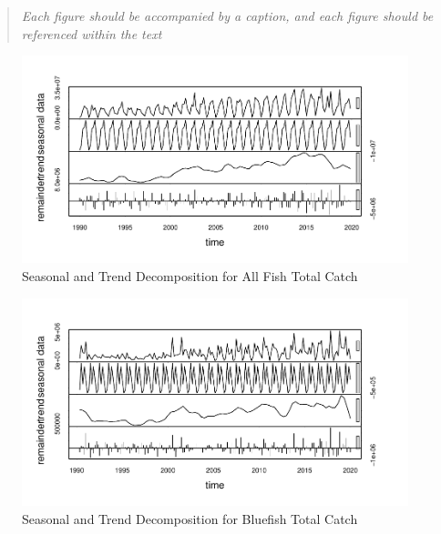 \documentclass[
  12pt,
]{article}
\begin{document}
\begin{quote}
\emph{Each figure should be accompanied by a caption, and each figure
should be referenced within the text}
\end{quote}

\begin{figure}[H]

\hfill{}\includegraphics{Report_FishTrends_files/figure-latex/All Fish Trends-1} 

\caption{Seasonal and Trend Decomposition for All Fish Total Catch}\label{fig:All Fish Trends}
\end{figure}

\begin{figure}[H]

\hfill{}\includegraphics{Report_FishTrends_files/figure-latex/Bluefish Trends-1} 

\caption{Seasonal and Trend Decomposition for Bluefish Total Catch}\label{fig:Bluefish Trends}
\end{figure}
\end{document}
